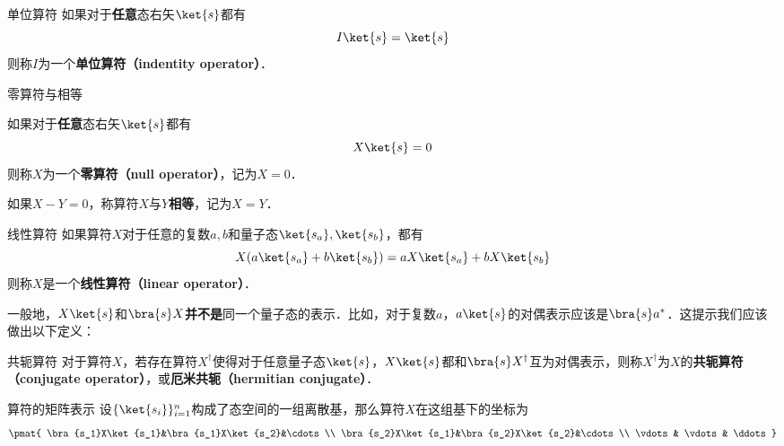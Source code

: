 \begin{definition}{单位算符}\label{QMPrcp_def9}
如果对于\textbf{任意}态右矢$\ket{s}$都有
\begin{equation}
I\ket{s} = \ket{s}
\end{equation}
则称$I$为一个\textbf{单位算符（indentity operator）}．
\end{definition}



\begin{definition}{零算符与相等}\label{QMPrcp_def10}

如果对于\textbf{任意}态右矢$\ket{s}$都有
\begin{equation}
X\ket{s} = 0
\end{equation}
则称$X$为一个\textbf{零算符（null operator）}，记为$X=0$．

如果$X-Y=0$，称算符$X$与$Y$\textbf{相等}，记为$X=Y$．

\end{definition}







\begin{definition}{线性算符}\label{QMPrcp_def11}
如果算符$X$对于任意的复数$a, b$和量子态$\ket{s_a}, \ket{s_b}$，都有
\begin{equation}
X(a\ket{s_a}+b\ket{s_b}) = aX\ket{s_a}+bX\ket{s_b}
\end{equation}
则称$X$是一个\textbf{线性算符（linear operator）}．
\end{definition}


一般地，$X\ket{s}$和$\bra{s}X$\textbf{并不是}同一个量子态的表示．比如，对于复数$a$，$a\ket{s}$的对偶表示应该是$\bra{s}a^*$．这提示我们应该做出以下定义：

\begin{definition}{共轭算符}\label{QMPrcp_def5}
对于算符$X$，若存在算符$X^\dagger$使得对于任意量子态$\ket{s}$，$X\ket{s}$都和$\bra{s}X^\dagger$互为对偶表示，则称$X^\dagger$为$X$的\textbf{共轭算符（conjugate operator）}，或\textbf{厄米共轭（hermitian conjugate）}．
\end{definition}





\begin{theorem}{算符的矩阵表示}\label{QMPrcp_the1}
设$\{\ket{s_i}\}_{i=1}^n$构成了态空间的一组离散基，那么算符$X$在这组基下的坐标为
\begin{equation}
\pmat{
    \bra{s_1}X\ket{s_1}&\bra{s_1}X\ket{s_2}&\cdots\\
    \bra{s_2}X\ket{s_1}&\bra{s_2}X\ket{s_2}&\cdots\\
    \vdots & \vdots& \ddots
}
\end{equation}
\end{theorem}

